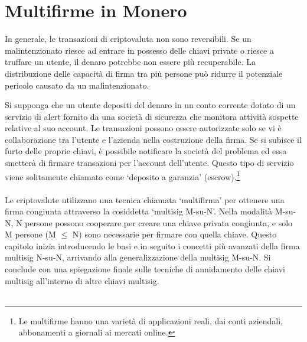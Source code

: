 \chapter{Multifirme in Monero}
\label{chapter:multisignatures}

In generale, le transazioni di criptovaluta non sono reversibili. Se un malintenzionato riesce ad entrare in possesso delle chiavi private o riesce a truffare un utente, il denaro potrebbe non essere più recuperabile. La distribuzione delle capacità di firma tra più persone può ridurre il potenziale pericolo causato da un malintenzionato.

Si supponga che un utente depositi del denaro in un conto corrente dotato di un servizio di alert fornito da una società di sicurezza che monitora attività sospette relative al suo account. Le transazioni possono essere autorizzate solo se vi è collaborazione tra l'utente e l'azienda nella costruzione della firma. Se si subisce il furto delle proprie chiavi, è possibile notificare la società del problema ed essa smetterà di firmare transazioni per l'account dell'utente. Questo tipo di servizio viene solitamente chiamato come `deposito a garanzia' (escrow).\footnote{Le multifirme hanno una varietà di applicazioni reali, dai conti aziendali, abbonamenti a giornali ai mercati online.}\\\\

Le criptovalute utilizzano una tecnica chiamata `multifirma' per ottenere una firma congiunta attraverso la cosiddetta `multisig M-su-N'. Nella modalità M-su-N, N persone possono cooperare per creare una chiave privata congiunta, e solo M persone (M $\leq$ N) sono necessarie per firmare con quella chiave. Questo capitolo inizia introducendo le basi e in seguito i concetti più avanzati della firma multisig N-su-N, arrivando alla generalizzazione della multisig M-su-N. Si conclude con una spiegazione finale sulle tecniche di annidamento delle chiavi multisig all'interno di altre chiavi multisig.\\\\

